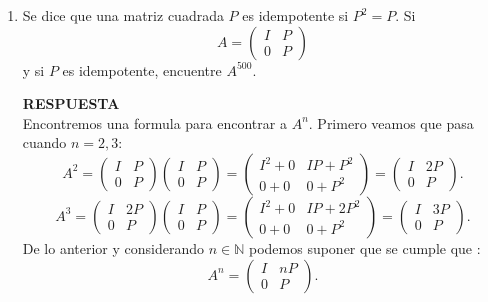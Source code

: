 \documentclass[11pt,letterpaper]{article}
\newcommand{\res}{\textbf{RESPUESTA}\\}
\begin{document}
\begin{enumerate}
\item Se dice que una matriz cuadrada $P$ es idempotente si $P^2=P$. Si 
\begin{equation*}
A=\left(\begin{array}{cc}
I& P\\
0&P
\end{array}
\right)
\end{equation*}
y si $P$ es idempotente, encuentre $A^{500}.$

\res
Encontremos una formula para encontrar a $A^n$. Primero veamos que pasa cuando $n=2,3$:
\begin{equation*}
A^2=\left(\begin{array}{cc}
I& P\\
0&P
\end{array}
\right)\left(\begin{array}{cc}
I& P\\
0&P
\end{array}
\right)=
\left(\begin{array}{cc}
I^2+0& IP+P^2\\
0+0&0+P^2
\end{array}
\right)=\left(\begin{array}{cc}
I&2P\\
0&P
\end{array}
\right).
\end{equation*}
\begin{equation*}
A^3=\left(\begin{array}{cc}
I& 2P\\
0&P
\end{array}
\right)\left(\begin{array}{cc}
I& P\\
0&P
\end{array}
\right)=
\left(\begin{array}{cc}
I^2+0& IP+2P^2\\
0+0&0+P^2
\end{array}
\right)=\left(\begin{array}{cc}
I&3P\\
0&P
\end{array}
\right).
\end{equation*}
De lo anterior y considerando $n\in \mathbb{N}$ podemos suponer que se cumple que :
\begin{equation*}
A^n= \left(\begin{array}{cc}
I&nP\\
0&P
\end{array}
\right).
\end{equation*}

\end{enumerate}
\end{document}
